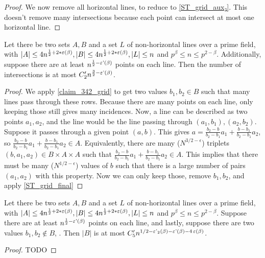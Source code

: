 \begin{proof}
    \leanok
    We now remove all horizontal lines, to reduce to \ref{ST_grid_aux₂}.
    This doesn't remove many intersections because each point can intersect at most one horizontal line.
\end{proof}

\begin{theorem}
    \label{ST_grid_aux₂}
    \leanok
    Let there be two sets $A, B$ and a set $L$ of non-horizontal lines over a prime field, 
    with $|A| \leq 4n^{\frac12 + 2*\operatorname{\varepsilon}(\beta)}, |B| \leq 4n^{\frac12 + 2*\operatorname{\varepsilon}(\beta)}, |L| \leq n$ and $p^\beta \leq n \leq p^{2 - \beta}$.
    Additionally, suppose there are at least $n^{\frac12 - \operatorname{\varepsilon'}(\beta)}$ points on each line.
    Then the number of intersections is at most $C'_2 n^{\frac32 - \operatorname{\varepsilon'}(\beta)}$.
\end{theorem}

\begin{proof}
    \leanok
    We apply \ref{claim_342_grid} to get two values $b_1, b_2 \in B$ such that many lines pass
    through these rows. Because there are many points on each line, only keeping those still gives many
    incidences. Now, a line can be described as two points $a_1, a_2$, and the line would be the line passing through
    $(a_1, b_1), (a_2, b_2)$. Suppose it passes through a given point $(a, b)$. This gives
    $a = \frac{b_2 - b}{b_2 - b_1} a_1 + \frac{b - b_1}{b_2 - b_1} a_2$, so
    $\frac{b_2 - b}{b_2 - b_1} a_1 + \frac{b - b_1}{b_2 - b_1} a_2 \in A$. Equivalently, there are many ($N^{3/2 - \epsilon}$) triplets
    $(b, a_1, a_2) \in B \times A \times A$ such that $\frac{b_2 - b}{b_2 - b_1} a_1 + \frac{b - b_1}{b_2 - b_1} a_2 \in A$.
    This implies that there must be many ($N^{1/2 - \epsilon}$) values of $b$ such that there is a large number of pairs
    $(a_1, a_2)$ with this property. Now we can only keep those, remove $b_1, b_2$, and apply \ref{ST_grid_final}
\end{proof}

\begin{theorem}
    \label{ST_grid_final}
    \leanok
    Let there be two sets $A, B$ and a set $L$ of non-horizontal lines over a prime field, 
    with $|A| \leq 4n^{\frac12 + 2*\operatorname{\varepsilon}(\beta)}, |B| \leq 4n^{\frac12 + 2*\operatorname{\varepsilon}(\beta)}, |L| \leq n$ and $p^\beta \leq n \leq p^{2 - \beta}$.
    Suppose there are at least $n^{\frac12 - \operatorname{\varepsilon'}(\beta)}$ points on each line, and lastly,
    suppose there are two values $b_1, b_2 \notin B$, .
    Then $|B|$ is at most $C'_5 n^{1/2 - \operatorname{\varepsilon'_2}(\beta) - \operatorname{\varepsilon'}(\beta) - 4 \operatorname{\varepsilon}(\beta)}$.
\end{theorem}

\begin{proof}
    \leanok
    TODO
\end{proof}